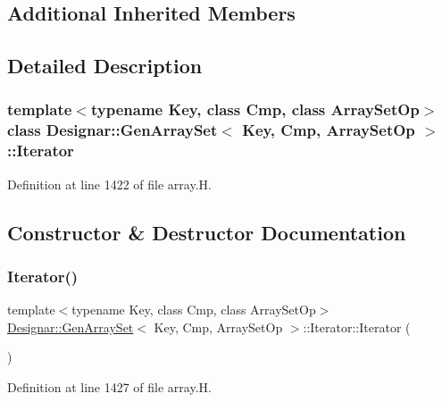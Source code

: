 \subsection*{Additional Inherited Members}


\subsection{Detailed Description}
\subsubsection*{template$<$typename Key, class Cmp, class Array\+Set\+Op$>$\newline
class Designar\+::\+Gen\+Array\+Set$<$ Key, Cmp, Array\+Set\+Op $>$\+::\+Iterator}



Definition at line 1422 of file array.\+H.



\subsection{Constructor \& Destructor Documentation}
\mbox{\label{class_designar_1_1_gen_array_set_1_1_iterator_a9f4aba730b697c071ffc51ef70db48ce}} 
\subsubsection{\texorpdfstring{Iterator()}{Iterator()}\hspace{0.1cm}{\footnotesize\ttfamily [1/5]}}
{\footnotesize\ttfamily template$<$typename Key, class Cmp, class Array\+Set\+Op$>$ \\
\hyperlink{class_designar_1_1_gen_array_set}{Designar\+::\+Gen\+Array\+Set}$<$ Key, Cmp, Array\+Set\+Op $>$\+::Iterator\+::\+Iterator (\begin{DoxyParamCaption}{ }\end{DoxyParamCaption})\hspace{0.3cm}{\ttfamily [inline]}}



Definition at line 1427 of file array.\+H.

\mbox{\label{class_designar_1_1_gen_array_set_1_1_iterator_ae7870668057c79aefda6001548c550f1}} 
